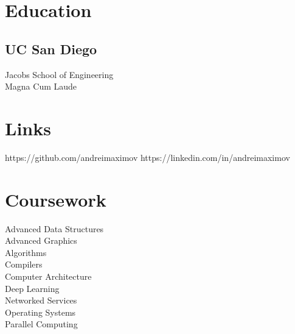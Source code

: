 \documentclass[]{resume}
\begin{document}
%
%
\lastupdated

%
%




%
%

\begin{minipage}[t]{0.33\textwidth}


\section{Education}

\subsection{UC San Diego}
Jacobs School of Engineering \\
Magna Cum Laude \\
\sectionsep


\section{Links}
https://github.com/andreimaximov
https://linkedin.com/in/andreimaximov
\sectionsep


\section{Coursework}

Advanced Data Structures \\
Advanced Graphics \\
Algorithms \\
Compilers \\
Computer Architecture \\
Deep Learning \\
Networked Services \\
Operating Systems \\
Parallel Computing


\end{minipage}
\end{document}
